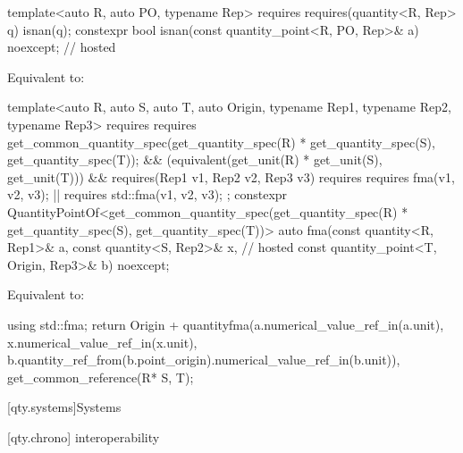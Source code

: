 \begin{itemdecl}
template<auto R, auto PO, typename Rep>
  requires requires(quantity<R, Rep> q) { isnan(q); }
constexpr bool isnan(const quantity_point<R, PO, Rep>& a) noexcept;                     // hosted
\end{itemdecl}

\begin{itemdescr}
\pnum
\effects
Equivalent to:
\end{itemdescr}

\begin{itemdecl}
template<auto R, auto S, auto T, auto Origin, typename Rep1, typename Rep2, typename Rep3>
  requires requires {
    get_common_quantity_spec(get_quantity_spec(R) * get_quantity_spec(S), get_quantity_spec(T));
  } && (equivalent(get_unit(R) * get_unit(S), get_unit(T))) &&
             requires(Rep1 v1, Rep2 v2, Rep3 v3) {
               requires requires { fma(v1, v2, v3); } || requires { std::fma(v1, v2, v3); };
             }
constexpr QuantityPointOf<get_common_quantity_spec(get_quantity_spec(R) * get_quantity_spec(S),
                                                   get_quantity_spec(T))> auto
fma(const quantity<R, Rep1>& a, const quantity<S, Rep2>& x,                             // hosted
    const quantity_point<T, Origin, Rep3>& b) noexcept;
\end{itemdecl}

\begin{itemdescr}
\pnum
\effects
Equivalent to:
\begin{codeblock}
using std::fma;
return Origin +
       quantity{fma(a.numerical_value_ref_in(a.unit), x.numerical_value_ref_in(x.unit),
                    b.quantity_ref_from(b.point_origin).numerical_value_ref_in(b.unit)),
                get_common_reference(R* S, T)};
\end{codeblock}
\end{itemdescr}

[qty.systems]{Systems}

[qty.chrono]{ interoperability}

